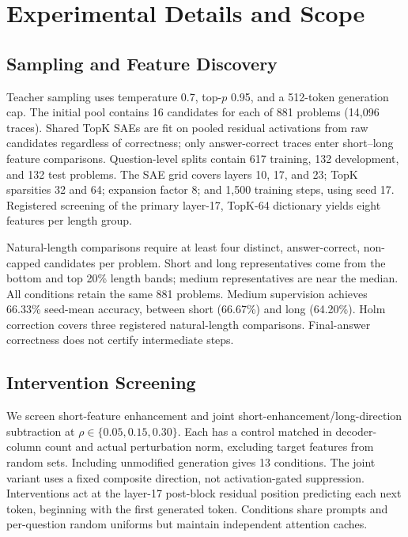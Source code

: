 \section{Experimental Details and Scope}
\label{app:details}

\subsection{Sampling and Feature Discovery}
\label{app:sampling}

Teacher sampling uses temperature 0.7, top-$p$ 0.95, and a 512-token generation cap.
The initial pool contains 16 candidates for each of 881 problems (14,096 traces).
Shared TopK SAEs are fit on pooled residual activations from raw candidates regardless of correctness; only answer-correct traces enter short--long feature comparisons.
Question-level splits contain 617 training, 132 development, and 132 test problems.
The SAE grid covers layers 10, 17, and 23; TopK sparsities 32 and 64; expansion factor 8; and 1,500 training steps, using seed 17.
Registered screening of the primary layer-17, TopK-64 dictionary yields eight features per length group.

Natural-length comparisons require at least four distinct, answer-correct, non-capped candidates per problem.
Short and long representatives come from the bottom and top 20\% length bands; medium representatives are near the median.
All conditions retain the same 881 problems.
Medium supervision achieves 66.33\% seed-mean accuracy, between short (66.67\%) and long (64.20\%).
Holm correction covers three registered natural-length comparisons.
Final-answer correctness does not certify intermediate steps.

\subsection{Intervention Screening}
\label{app:screening}

We screen short-feature enhancement and joint short-enhancement/long-direction subtraction at $\rho\in\{0.05,0.15,0.30\}$.
Each has a control matched in decoder-column count and actual perturbation norm, excluding target features from random sets.
Including unmodified generation gives 13 conditions.
The joint variant uses a fixed composite direction, not activation-gated suppression.
Interventions act at the layer-17 post-block residual position predicting each next token, beginning with the first generated token.
Conditions share prompts and per-question random uniforms but maintain independent attention caches.

